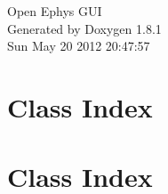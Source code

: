 \documentclass{book}
\begin{document}
\hypersetup{pageanchor=false,citecolor=blue}
\begin{titlepage}
\vspace*{7cm}
\begin{center}
{\Large Open Ephys G\-U\-I }\\
\vspace*{1cm}
{\large Generated by Doxygen 1.8.1}\\
\vspace*{0.5cm}
{\small Sun May 20 2012 20:47:57}\\
\end{center}
\end{titlepage}
\clearemptydoublepage
{}
\tableofcontents
\clearemptydoublepage
{}
\hypersetup{pageanchor=true,citecolor=blue}
\chapter{Class Index}

\chapter{Class Index}

\end{document}
